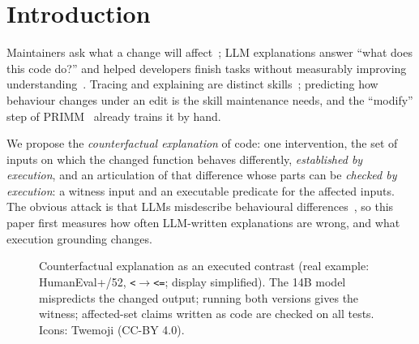 \section{Introduction}\label{sec:intro}
Maintainers ask what a change will affect~\cite{sillito2006questions,ko2007information}; LLM explanations answer ``what
does this code do?'' and helped developers finish tasks without measurably improving understanding~\cite{nam2024gilt}. Tracing and explaining are distinct skills~\cite{lister2009tracing,murphy2012eipe};
predicting how behaviour changes under an edit is the skill maintenance needs, and the ``modify'' step of
PRIMM~\cite{sentance2019primm} already trains it by hand.

We propose the \emph{counterfactual explanation} of code: one intervention, the set of inputs on which the changed
function behaves differently, \emph{established by execution}, and an articulation of that difference whose parts can be
\emph{checked by execution}: a witness input and an executable predicate for the affected inputs. The obvious attack is
that LLMs misdescribe behavioural differences~\cite{khatib2026mutation,reddy2026articulate}, so this paper first measures
how often LLM-written explanations are wrong, and what execution grounding changes.
\begin{figure}[!t]
\centering

\caption{Counterfactual explanation as an executed contrast (real example: HumanEval+/52, \texttt{<}$\to$\texttt{<=};
display simplified). The 14B model mispredicts the changed output; running both versions gives the witness; affected-set
claims written as code are checked on all tests. Icons: Twemoji (CC-BY 4.0).}\label{fig:teaser}
\end{figure}

\noindent{}
\smallskip


